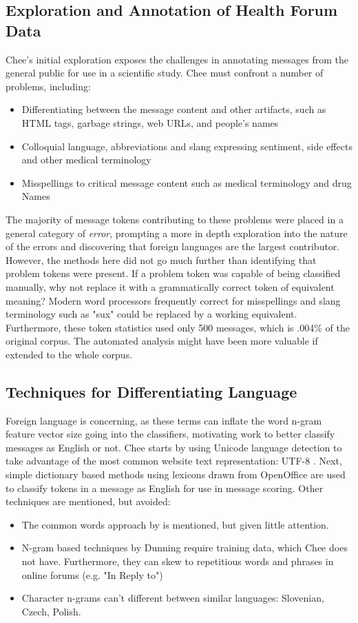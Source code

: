 \documentclass[twoside,11pt]{article}
\begin{document}
\subsection{Exploration and Annotation of Health Forum Data}
Chee's initial exploration exposes the challenges in annotating messages from the general public for use in a scientific study. Chee must confront a number of problems, including:
\begin{itemize}
  \item Differentiating between the message content and other artifacts, such as HTML tags, garbage strings, web URLs, and people's names
  \item Colloquial language, abbreviations and slang expressing sentiment, side effects and other medical terminology
  \item Misspellings to critical message content such as medical terminology and drug Names
\end{itemize}
The majority of message tokens contributing to these problems were placed in a general category of \textit{error}, prompting a more in depth exploration into the nature of the errors and discovering that foreign languages are the largest contributor. However, the methods here did not go much further than identifying that problem tokens were present. If a problem token was capable of being classified manually, why not replace it with a grammatically correct token of equivalent meaning? Modern word processors frequently correct for misspellings and slang terminology such as "sux" could be replaced by a working equivalent. Furthermore, these token statistics used only 500 messages, which is .004\% of the original corpus. The automated analysis might have been more valuable if extended to the whole corpus.

\subsection{Techniques for Differentiating Language}
Foreign language is concerning, as these terms can inflate the word n-gram feature vector size going into the classifiers, motivating work to better classify messages as English or not. Chee starts by using Unicode language detection to take advantage of the most common website text representation: UTF-8 \citep{UTF_8 article on Wikipedia}. Next, simple dictionary based methods using lexicons drawn from OpenOffice are used to classify tokens in a message as English for use in message scoring. Other techniques are mentioned, but avoided:
\begin{itemize}
  \item The common words approach by \citep{Ingle, 1976} is mentioned, but given little attention.
  \item N-gram based techniques by Dunning \citep{Dunning} require training data, which Chee does not have. Furthermore, they can skew to repetitious words and phrases in online forums (e.g. "In Reply to")
  \item Character n-grams can't different between similar languages: Slovenian, Czech, Polish.
\end{itemize}
\end{document}
